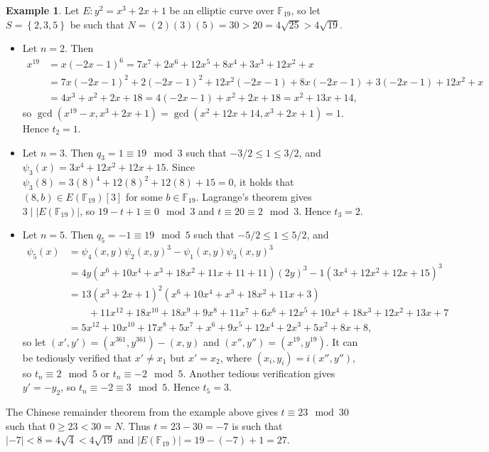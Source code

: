 \documentclass{article}
\newcommand{\F}{\mathbb{F}}
\newcommand{\rb}[1]{\left( #1 \right)}
\renewcommand{\sb}[1]{\left[ #1 \right]}
\newcommand{\cb}[1]{\left\{ #1 \right\}}
\newcommand{\abs}[1]{\left\lvert #1 \right\rvert}
\theoremstyle{definition}\newtheorem*{definition}{Definition}
\theoremstyle{definition}\newtheorem*{example}{Example}
\theoremstyle{definition}\newtheorem*{remark}{Remark}
\begin{document}
\begin{example}
Let $ E : y^2 = x^3 + 2x + 1 $ be an elliptic curve over $ \F_{19} $, so let $ S = \cb{2, 3, 5} $ be such that $ N = \rb{2}\rb{3}\rb{5} = 30 > 20 = 4\sqrt{25} > 4\sqrt{19} $.
\begin{itemize}
\item Let $ n = 2 $. Then
\begin{align*}
x^{19}
& = x\rb{-2x - 1}^6
= 7x^7 + 2x^6 + 12x^5 + 8x^4 + 3x^3 + 12x^2 + x \\
& = 7x\rb{-2x - 1}^2 + 2\rb{-2x - 1}^2 + 12x^2\rb{-2x - 1} + 8x\rb{-2x - 1} + 3\rb{-2x - 1} + 12x^2 + x \\
& = 4x^3 + x^2 + 2x + 18
= 4\rb{-2x - 1} + x^2 + 2x + 18
= x^2 + 13x + 14,
\end{align*}
so $ \gcd\rb{x^{19} - x, x^3 + 2x + 1} = \gcd\rb{x^2 + 12x + 14, x^3 + 2x + 1} = 1 $. Hence $ t_2 = 1 $.
\item Let $ n = 3 $. Then $ q_3 = 1 \equiv 19 \mod 3 $ such that $ -3 / 2 \le 1 \le 3 / 2 $, and $ \psi_3\rb{x} = 3x^4 + 12x^2 + 12x + 15 $. Since $ \psi_3\rb{8} = 3\rb{8}^4 + 12\rb{8}^2 + 12\rb{8} + 15 = 0 $, it holds that $ \rb{8, b} \in E\rb{\F_{19}}\sb{3} $ for some $ b \in \F_{19} $. Lagrange's theorem gives $ 3 \mid \abs{E\rb{\F_{19}}} $, so $ 19 - t + 1 \equiv 0 \mod 3 $ and $ t \equiv 20 \equiv 2 \mod 3 $. Hence $ t_3 = 2 $.
\item Let $ n = 5 $. Then $ q_5 = -1 \equiv 19 \mod 5 $ such that $ -5 / 2 \le 1 \le 5 / 2 $, and
\begin{align*}
\psi_5\rb{x}
& = \psi_4\rb{x, y}\psi_2\rb{x, y}^3 - \psi_1\rb{x, y}\psi_3\rb{x, y}^3 \\
& = 4y\rb{x^6 + 10x^4 + x^3 + 18x^2 + 11x + 11 + 11}\rb{2y}^3 - 1\rb{3x^4 + 12x^2 + 12x + 15}^3 \\
& = 13\rb{x^3 + 2x + 1}^2\rb{x^6 + 10x^4 + x^3 + 18x^2 + 11x + 3} \\
& \qquad + 11x^{12} + 18x^{10} + 18x^9 + 9x^8 + 11x^7 + 6x^6 + 12x^5 + 10x^4 + 18x^3 + 12x^2 + 13x + 7 \\
& = 5x^{12} + 10x^{10} + 17x^8 + 5x^7 + x^6 + 9x^5 + 12x^4 + 2x^3 + 5x^2 + 8x + 8,
\end{align*}
so let $ \rb{x', y'} = \rb{x^{361}, y^{361}} - \rb{x, y} $ and $ \rb{x'', y''} = \rb{x^{19}, y^{19}} $. It can be tediously verified that $ x' \ne x_1 $ but $ x' = x_2 $, where $ \rb{x_i, y_i} = i\rb{x'', y''} $, so $ t_n \equiv 2 \mod 5 $ or $ t_n \equiv -2 \mod 5 $. Another tedious verification gives $ y' = -y_2 $, so $ t_n \equiv -2 \equiv 3 \mod 5 $. Hence $ t_5 = 3 $.
\end{itemize}
The Chinese remainder theorem from the example above gives $ t \equiv 23 \mod 30 $ such that $ 0 \ge 23 < 30 = N $. Thus $ t = 23 - 30 = -7 $ is such that $ \abs{-7} < 8 = 4\sqrt{4} < 4\sqrt{19} $ and $ \abs{E\rb{\F_{19}}} = 19 - \rb{-7} + 1 = 27 $.
\end{example}
\end{document}
